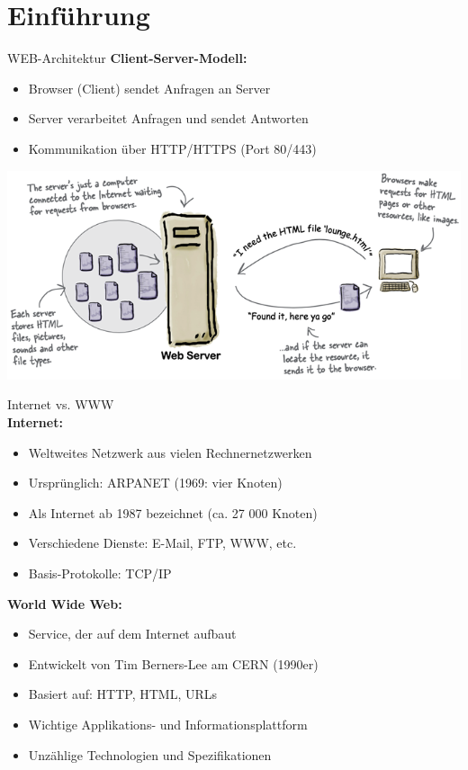 \section{Einführung}

\begin{definition}{WEB-Architektur}
    \textbf{Client-Server-Modell:}
    \begin{itemize}
        \item Browser (Client) sendet Anfragen an Server
        \item Server verarbeitet Anfragen und sendet Antworten
        \item Kommunikation über HTTP/HTTPS (Port 80/443)
    \end{itemize}
    \includegraphics[width=0.8\linewidth]{images/web_architektur.png}
\end{definition}

\begin{concept}{Internet vs. WWW}\\
    \textbf{Internet:}
    \begin{itemize}
        \item Weltweites Netzwerk aus vielen Rechnernetzwerken
        \item Ursprünglich: ARPANET (1969: vier Knoten)
        \item Als Internet ab 1987 bezeichnet (ca. 27 000 Knoten)
        \item Verschiedene Dienste: E-Mail, FTP, WWW, etc.
        \item Basis-Protokolle: TCP/IP
    \end{itemize}
    
    \textbf{World Wide Web:}
    \begin{itemize}
        \item Service, der auf dem Internet aufbaut
        \item Entwickelt von Tim Berners-Lee am CERN (1990er)
        \item Basiert auf: HTTP, HTML, URLs
        \item Wichtige Applikations- und Informationsplattform
        \item Unzählige Technologien und Spezifikationen
    \end{itemize}
\end{concept}

